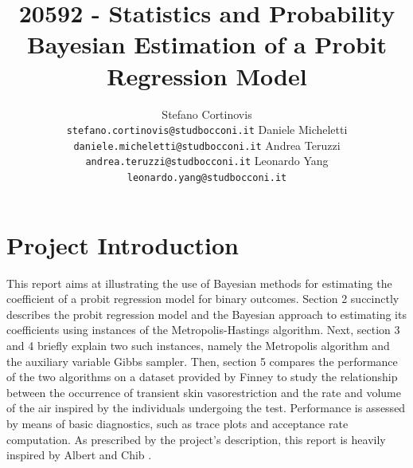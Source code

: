 \documentclass{article}
\title{20592 - Statistics and Probability\\Bayesian Estimation of a Probit Regression Model}
\author{%
  Stefano Cortinovis \\
  \texttt{stefano.cortinovis@studbocconi.it}
  \And
  Daniele Micheletti\\
  \texttt{daniele.micheletti@studbocconi.it}
  \And
  Andrea Teruzzi\\
  \texttt{andrea.teruzzi@studbocconi.it}
  \And
  Leonardo Yang\\
  \texttt{leonardo.yang@studbocconi.it}
}
\begin{document}
\maketitle

\section{Project Introduction}

This report aims at illustrating the use of Bayesian methods for estimating the coefficient of a probit regression model for binary outcomes. Section 2 succinctly describes the probit regression model and the Bayesian approach to estimating its coefficients using instances of the Metropolis-Hastings algorithm. Next, section 3 and 4 briefly explain two such instances, namely the Metropolis algorithm and the auxiliary variable Gibbs sampler. Then, section 5 compares the performance of the two algorithms on a dataset provided by Finney \cite{finney1947estimation} to study the relationship between the occurrence of transient skin vasorestriction and the rate and volume of the air inspired by the individuals undergoing the test. Performance is assessed by means of basic diagnostics, such as trace plots and acceptance rate computation. As prescribed by the project's description, this report is heavily inspired by Albert and Chib \cite{albert1993bayesian}.
\end{document}
